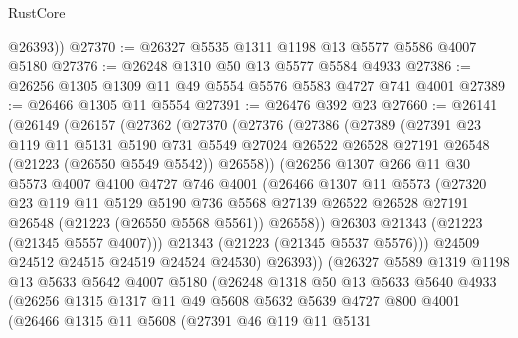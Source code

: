 \begin{lexlean}{RustCore}
\begin{coremodule}
        @26393))
@27370 := @26327 @5535 @1311 @1198 @13 @5577 @5586 @4007 @5180
@27376 := @26248 @1310 @50 @13 @5577 @5584 @4933
@27386 := @26256 @1305 @1309 @11 @49 @5554 @5576 @5583 @4727 @741 @4001
@27389 := @26466 @1305 @11 @5554
@27391 := @26476 @392 @23
@27660 := @26141
    (@26149
      (@26157
        (@27362
          (@27370
            (@27376
              (@27386
                (@27389
                  (@27391
                    @23
                    @119
                    @11
                    @5131
                    @5190
                    @731
                    @5549
                    @27024
                    @26522
                    @26528
                    @27191
                    @26548
                    (@21223 (@26550 @5549 @5542))
                    @26558))
                (@26256
                  @1307
                  @266
                  @11
                  @30
                  @5573
                  @4007
                  @4100
                  @4727
                  @746
                  @4001
                  (@26466
                    @1307
                    @11
                    @5573
                    (@27320
                      @23
                      @119
                      @11
                      @5129
                      @5190
                      @736
                      @5568
                      @27139
                      @26522
                      @26528
                      @27191
                      @26548
                      (@21223 (@26550 @5568 @5561))
                      @26558))
                  @26303
                  @21343
                  (@21223 (@21345 @5557 @4007)))
                @21343
                (@21223 (@21345 @5537 @5576)))
              @24509
              @24512
              @24515
              @24519
              @24524
              @24530)
            @26393))
        (@26327
          @5589
          @1319
          @1198
          @13
          @5633
          @5642
          @4007
          @5180
          (@26248
            @1318
            @50
            @13
            @5633
            @5640
            @4933
            (@26256
              @1315
              @1317
              @11
              @49
              @5608
              @5632
              @5639
              @4727
              @800
              @4001
              (@26466
                @1315
                @11
                @5608
                (@27391
                  @46
                  @119
                  @11
                  @5131

\end{coremodule}
\end{lexlean}
